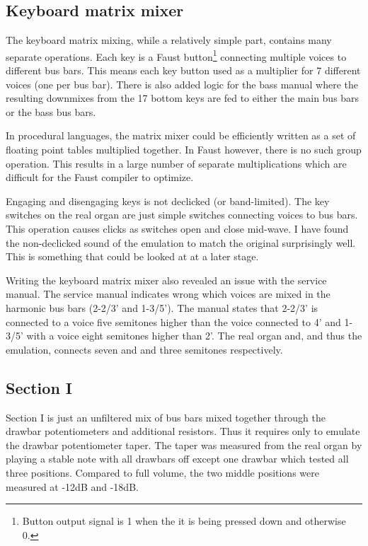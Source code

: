 \documentclass[11pt,a4paper]{article}
\begin{document}


\subsection{Keyboard matrix mixer}

The keyboard matrix mixing, while a relatively simple part, contains many separate operations. Each key is a Faust button\footnote{Button output signal is 1 when the it is being pressed down and otherwise 0.} connecting multiple voices to different bus bars. This means each key button used as a multiplier for 7 different voices (one per bus bar). There is also added logic for the bass manual where the resulting downmixes from the 17 bottom keys are fed to either the main bus bars or the bass bus bars.

In procedural languages, the matrix mixer could be efficiently written as a set of floating point tables multiplied together. In Faust however, there is no such group operation. This results in a large number of separate multiplications which are difficult for the Faust compiler to optimize.

Engaging and disengaging keys is not declicked (or band-limited). The key switches on the real organ are just simple switches connecting voices to bus bars. This operation causes clicks as switches open and close mid-wave. I have found the non-declicked sound of the emulation to match the original surprisingly well. This is something that could be looked at at a later stage.

Writing the keyboard matrix mixer also revealed an issue with the service manual. The service manual indicates wrong which voices are mixed in the harmonic bus bars (2-2/3' and 1-3/5'). The manual states that 2-2/3' is connected to a voice five semitones higher than the voice connected to 4' and 1-3/5' with a voice eight semitones higher than 2'. The real organ and, and thus the emulation, connects seven and and three semitones respectively.


\subsection{Section I}
\label{section:section-I}

Section I is just an unfiltered mix of bus bars mixed together through the drawbar potentiometers and additional resistors. Thus it requires only to emulate the drawbar potentiometer taper. The taper was measured from the real organ by playing a stable note with all drawbars off except one drawbar which tested all three positions. Compared to full volume, the two middle positions were measured at -12dB and -18dB.
\end{document}
